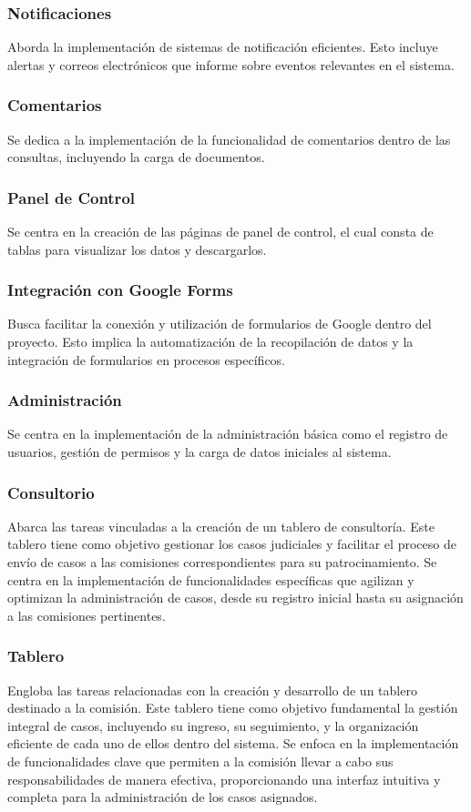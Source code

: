 \subsubsection{Notificaciones}
Aborda la implementación de sistemas de notificación eficientes. Esto incluye alertas y correos electrónicos que informe sobre eventos relevantes en el sistema.

\subsubsection{Comentarios}
Se dedica a la implementación de la funcionalidad de comentarios dentro de las consultas, incluyendo la carga de documentos.

\subsubsection{Panel de Control}
Se centra en la creación de las páginas de panel de control, el cual consta de tablas para visualizar los datos y descargarlos.

\subsubsection{Integración con Google Forms}
Busca facilitar la conexión y utilización de formularios de Google dentro del proyecto. Esto implica la automatización de la recopilación de datos y la integración de formularios en procesos específicos.

\subsubsection{Administración}
Se centra en la implementación de la administración básica como el registro de usuarios, gestión de permisos y la carga de datos iniciales al sistema.

\subsubsection{Consultorio}
Abarca las tareas vinculadas a la creación de un tablero de consultoría. Este tablero tiene como objetivo gestionar los casos judiciales y facilitar el proceso de envío de casos a las comisiones correspondientes para su patrocinamiento. Se centra en la implementación de funcionalidades específicas que agilizan y optimizan la administración de casos, desde su registro inicial hasta su asignación a las comisiones pertinentes.

\subsubsection{Tablero}
Engloba las tareas relacionadas con la creación y desarrollo de un tablero destinado a la comisión. Este tablero tiene como objetivo fundamental la gestión integral de casos, incluyendo su ingreso, su seguimiento, y la organización eficiente de cada uno de ellos dentro del sistema. Se enfoca en la implementación de funcionalidades clave que permiten a la comisión llevar a cabo sus responsabilidades de manera efectiva, proporcionando una interfaz intuitiva y completa para la administración de los casos asignados.



